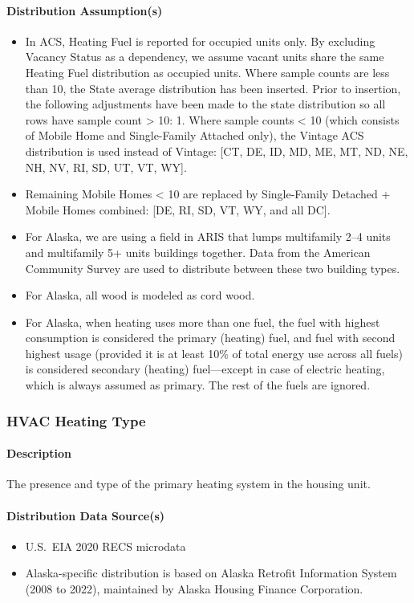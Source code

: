 \paragraph{Distribution Assumption(s)}
\begin{itemize}
    \item In ACS, Heating Fuel is reported for occupied units only. By excluding Vacancy Status as a dependency, we assume vacant units share the same Heating Fuel distribution as occupied units. Where sample counts are less than 10, the State average distribution has been inserted. Prior to insertion, the following adjustments have been made to the state distribution so all rows have sample count > 10: 1. Where sample counts < 10 (which consists of Mobile Home and Single-Family Attached only), the Vintage ACS distribution is used instead of Vintage: [CT, DE, ID, MD, ME, MT, ND, NE, NH, NV, RI, SD, UT, VT, WY].
    \item Remaining Mobile Homes < 10 are replaced by Single-Family Detached + Mobile Homes combined: [DE, RI, SD, VT, WY, and all DC].
    \item For Alaska, we are using a field in ARIS that lumps multifamily 2--4 units and multifamily 5+ units buildings together. Data from the American Community Survey are used to distribute between these two building types.
    \item For Alaska, all wood is modeled as cord wood.
    \item For Alaska, when heating uses more than one fuel, the fuel with highest consumption is considered the primary (heating) fuel, and fuel with second highest usage (provided it is at least 10\% of total energy use across all fuels) is considered secondary (heating) fuel---except in case of electric heating, which is always assumed as primary. The rest of the fuels are ignored.
\end{itemize}
 

\subsubsection{HVAC Heating Type}
\paragraph{Description}
The presence and type of the primary heating system in the housing unit.
\paragraph{Distribution Data Source(s)}
\begin{itemize}
    \item U.S.~EIA 2020 RECS microdata 
    \item Alaska-specific distribution is based on Alaska Retrofit Information System (2008 to 2022), maintained by Alaska Housing Finance Corporation.
\end{itemize}

